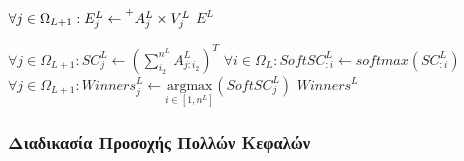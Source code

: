 {\begin{algorithm}[hp]
\begin{algorithmic}[1]
      
    \State $\forall j \in \Omega_{L+1}: E^L_j \gets \prescript{+}{}{A_j^L} \times V_j^L$  \label{op:method3_max_weighted_sum} %
    \State \Return $E^L$ 
    \EndProcedure

     
    \State $\forall j \in \Omega_{L+1}: SC_j^L \gets (\sum_{i_2}^{n^L} A^L_{j:i_2})^T$  \label{op:method3_max_sum_of_vector_columns} %
    \State {}
    \State $\forall i \in \Omega_L: SoftSC_{:i}^L \gets softmax(SC^L_{:i})$  \label{op:method3_max_softmax_like_previous_softmax}
    \State $\forall j \in \Omega_{L+1}: Winners_j^L \gets \underset{i \in [1,n^L]}{\mathrm{argmax}}(SoftSC_j^L)$ \label{op:method3_max_argmax_say_that_input_is_a_row}
    \State \Return $Winners^L$ 
    \EndProcedure

  \end{algorithmic}
  \end{algorithm}
}

\subsubsection{Διαδικασία Προσοχής Πολλών Κεφαλών}

